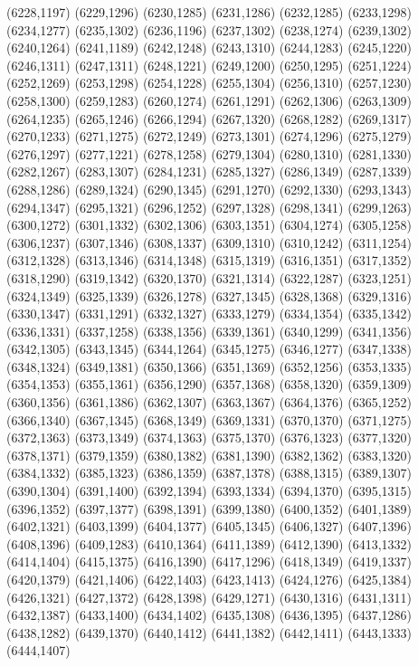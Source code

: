 (6228,1197)
(6229,1296)
(6230,1285)
(6231,1286)
(6232,1285)
(6233,1298)
(6234,1277)
(6235,1302)
(6236,1196)
(6237,1302)
(6238,1274)
(6239,1302)
(6240,1264)
(6241,1189)
(6242,1248)
(6243,1310)
(6244,1283)
(6245,1220)
(6246,1311)
(6247,1311)
(6248,1221)
(6249,1200)
(6250,1295)
(6251,1224)
(6252,1269)
(6253,1298)
(6254,1228)
(6255,1304)
(6256,1310)
(6257,1230)
(6258,1300)
(6259,1283)
(6260,1274)
(6261,1291)
(6262,1306)
(6263,1309)
(6264,1235)
(6265,1246)
(6266,1294)
(6267,1320)
(6268,1282)
(6269,1317)
(6270,1233)
(6271,1275)
(6272,1249)
(6273,1301)
(6274,1296)
(6275,1279)
(6276,1297)
(6277,1221)
(6278,1258)
(6279,1304)
(6280,1310)
(6281,1330)
(6282,1267)
(6283,1307)
(6284,1231)
(6285,1327)
(6286,1349)
(6287,1339)
(6288,1286)
(6289,1324)
(6290,1345)
(6291,1270)
(6292,1330)
(6293,1343)
(6294,1347)
(6295,1321)
(6296,1252)
(6297,1328)
(6298,1341)
(6299,1263)
(6300,1272)
(6301,1332)
(6302,1306)
(6303,1351)
(6304,1274)
(6305,1258)
(6306,1237)
(6307,1346)
(6308,1337)
(6309,1310)
(6310,1242)
(6311,1254)
(6312,1328)
(6313,1346)
(6314,1348)
(6315,1319)
(6316,1351)
(6317,1352)
(6318,1290)
(6319,1342)
(6320,1370)
(6321,1314)
(6322,1287)
(6323,1251)
(6324,1349)
(6325,1339)
(6326,1278)
(6327,1345)
(6328,1368)
(6329,1316)
(6330,1347)
(6331,1291)
(6332,1327)
(6333,1279)
(6334,1354)
(6335,1342)
(6336,1331)
(6337,1258)
(6338,1356)
(6339,1361)
(6340,1299)
(6341,1356)
(6342,1305)
(6343,1345)
(6344,1264)
(6345,1275)
(6346,1277)
(6347,1338)
(6348,1324)
(6349,1381)
(6350,1366)
(6351,1369)
(6352,1256)
(6353,1335)
(6354,1353)
(6355,1361)
(6356,1290)
(6357,1368)
(6358,1320)
(6359,1309)
(6360,1356)
(6361,1386)
(6362,1307)
(6363,1367)
(6364,1376)
(6365,1252)
(6366,1340)
(6367,1345)
(6368,1349)
(6369,1331)
(6370,1370)
(6371,1275)
(6372,1363)
(6373,1349)
(6374,1363)
(6375,1370)
(6376,1323)
(6377,1320)
(6378,1371)
(6379,1359)
(6380,1382)
(6381,1390)
(6382,1362)
(6383,1320)
(6384,1332)
(6385,1323)
(6386,1359)
(6387,1378)
(6388,1315)
(6389,1307)
(6390,1304)
(6391,1400)
(6392,1394)
(6393,1334)
(6394,1370)
(6395,1315)
(6396,1352)
(6397,1377)
(6398,1391)
(6399,1380)
(6400,1352)
(6401,1389)
(6402,1321)
(6403,1399)
(6404,1377)
(6405,1345)
(6406,1327)
(6407,1396)
(6408,1396)
(6409,1283)
(6410,1364)
(6411,1389)
(6412,1390)
(6413,1332)
(6414,1404)
(6415,1375)
(6416,1390)
(6417,1296)
(6418,1349)
(6419,1337)
(6420,1379)
(6421,1406)
(6422,1403)
(6423,1413)
(6424,1276)
(6425,1384)
(6426,1321)
(6427,1372)
(6428,1398)
(6429,1271)
(6430,1316)
(6431,1311)
(6432,1387)
(6433,1400)
(6434,1402)
(6435,1308)
(6436,1395)
(6437,1286)
(6438,1282)
(6439,1370)
(6440,1412)
(6441,1382)
(6442,1411)
(6443,1333)
(6444,1407)
